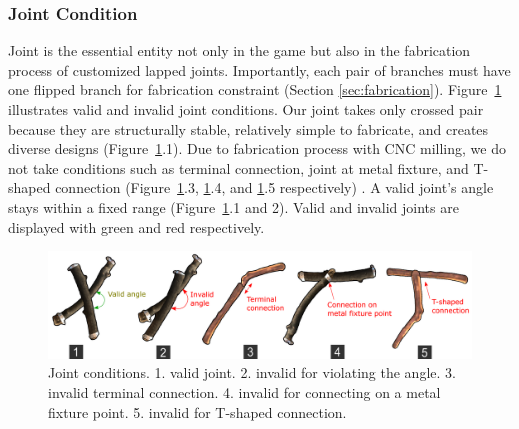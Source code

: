 \subsubsection{Joint Condition}
\label{sec:joint}
Joint is the essential entity not only in the game but also in the fabrication process of customized lapped joints.
Importantly, each pair of branches must have one flipped branch for fabrication constraint (Section \ref{sec:fabrication}).
Figure~\ref{fig:joint_condition} illustrates valid and invalid joint conditions.
Our joint takes only crossed pair because they are structurally stable, relatively simple to fabricate, and creates diverse designs (Figure~\ref{fig:joint_condition}.1). 
Due to fabrication process with CNC milling, we do not take conditions such as terminal connection, joint at metal fixture, and T-shaped connection (Figure~\ref{fig:joint_condition}.3, \ref{fig:joint_condition}.4, and \ref{fig:joint_condition}.5 respectively) .
A valid joint's angle stays within a fixed range (Figure~\ref{fig:joint_condition}.1 and 2).
Valid and invalid joints are displayed with green and red respectively.

\begin{figure}[ht]
	\begin{center}
		\includegraphics[width = 0.4\paperwidth]{images/system/joint_conditions_3.png}
		\caption{Joint conditions. 1. valid joint. 2. invalid for violating the angle. 3. invalid terminal connection. 4. invalid for connecting on a metal fixture point. 5. invalid for T-shaped connection.}
		\label{fig:joint_condition}
	\end{center}
\end{figure}




